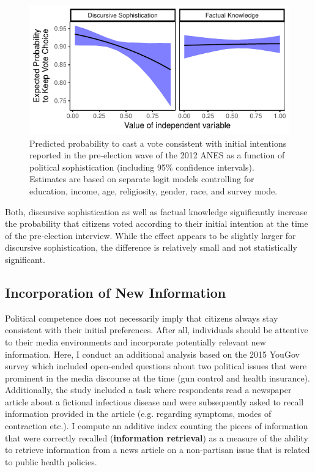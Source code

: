 \documentclass[12pt]{article}
\begin{document}
\begin{figure}[h]\centering
\includegraphics{../fig/prepost_exp.pdf}
\caption{Predicted probability to cast a vote consistent with initial intentions reported in the pre-election wave of the 2012 ANES as a function of political sophistication (including 95\% confidence intervals). Estimates are based on separate logit models controlling for education, income, age, religiosity, gender, race, and survey mode.}\label{fig:prepost}
\end{figure}

Both, discursive sophistication as well as factual knowledge significantly increase the probability that citizens voted according to their initial intention at the time of the pre-election interview. While the effect appears to be slightly larger for discursive sophistication, the difference is relatively small and not statistically significant.


\subsection*{Incorporation of New Information}

Political competence does not necessarily imply that citizens always stay consistent with their initial preferences. After all, individuals should be attentive to their media environments and incorporate potentially relevant new information. Here, I conduct an additional analysis based on the 2015 YouGov survey which included open-ended questions about two political issues that were prominent in the media discourse at the time (gun control and health insurance). Additionally, the study included a task where respondents read a newspaper article about a fictional infectious disease and were subsequently asked to recall information provided in the article (e.g. regarding symptoms, modes of contraction etc.). I compute an additive index counting the pieces of information that were correctly recalled (\textbf{information retrieval}) as a measure of the ability to retrieve information from a news article on a non-partisan issue that is related to public health policies. 
\end{document}
